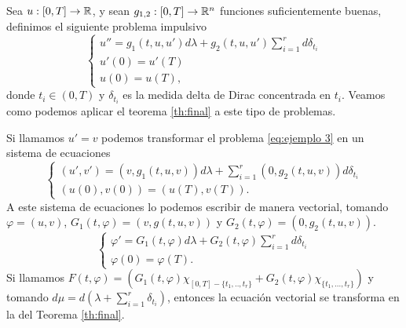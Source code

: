  \begin{example}\label{ejemplo vectorial}
 	Sea $u:[0,T]\to \mathbb{R}$, y sean $g_{1,2}:[0,T]\to \mathbb{R}^n$  funciones suficientemente buenas, definimos el siguiente problema impulsivo
 	 \begin{equation}\label{eq:ejemplo 3}
 		\left\lbrace \begin{array}{l}
    u''=g_1(t,u,u')d\lambda+g_2(t,u,u') \displaystyle\sum_{i=1}^rd\delta_{t_i}\\
 			u'(0)=u'(T)\\
 			u(0)=u(T),
 		\end{array}\right. 
 	\end{equation} 
 donde $t_i\in(0,T)$ y $\delta_{t_i}$ es la medida delta de Dirac concentrada en $t_i$. Veamos como podemos aplicar el teorema \ref{th:final} a este tipo de problemas.
 
 Si llamamos $u'=v$  podemos transformar el problema \eqref{eq:ejemplo 3} en un sistema de ecuaciones
  \begin{equation*}
 	\left\lbrace \begin{array}{l}
 		(u',v')=\left(v, g_1(t,u,v)\right)d\lambda +\displaystyle\sum_{i=1}^r\left(0,g_2(t,u,v)\right)d \delta_{t_i}\\
   (u(0),v(0))=(u(T),v(T)).
 	\end{array}\right. 
 \end{equation*} 
A este sistema de ecuaciones lo podemos escribir de manera vectorial, tomando $\varphi=(u,v)$, $G_1(t,\varphi)=(v,g(t,u,v))$ y $G_2(t,\varphi)=(0,g_2(t,u,v))$.
  \begin{equation*}
	\left\lbrace \begin{array}{l}
	\varphi'=G_1(t,\varphi)d\lambda+G_2(t,\varphi)\displaystyle\sum_{i=1}^r d \delta_{t_i}\\
 \varphi(0)=\varphi(T).
	\end{array}\right. 
\end{equation*} 
Si llamamos $F(t,\varphi)=\left( G_1(t,\varphi)\chi_{[0,T]-\{t_1,..,t_r\}}+G_2(t,\varphi)\chi_{\{t_1,...,t_r\}}\right) $ y tomando $d\mu=d\left(\lambda+\displaystyle\sum_{i=1}^r\delta_{t_i}\right)$, entonces la ecuación vectorial se transforma en la del Teorema \ref{th:final}. 
 \end{example}
